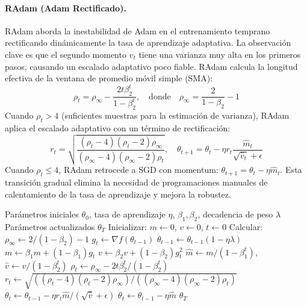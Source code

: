 \documentclass[11pt,a4paper]{article}
\begin{document}
\paragraph{RAdam (Adam Rectificado).}
RAdam aborda la inestabilidad de Adam en el entrenamiento temprano rectificando dinámicamente la tasa de aprendizaje adaptativa. La observación clave es que el segundo momento $v_t$ tiene una varianza muy alta en los primeros pasos, causando un escalado adaptativo poco fiable. RAdam calcula la longitud efectiva de la ventana de promedio móvil simple (SMA):
\[\rho_t = \rho_{\infty} - \frac{2t\beta_2^t}{1-\beta_2^t}, \quad \text{donde} \quad \rho_{\infty} = \frac{2}{1-\beta_2}-1\]
Cuando $\rho_t > 4$ (suficientes muestras para la estimación de varianza), RAdam aplica el escalado adaptativo con un término de rectificación:
\[r_t = \sqrt{\frac{(\rho_t-4)(\rho_t-2)\rho_{\infty}}{(\rho_{\infty}-4)(\rho_{\infty}-2)\rho_t}}, \quad \theta_{t+1} = \theta_t - \eta r_t \frac{\hat{m}_t}{\sqrt{\hat{v}_t}+\epsilon}\]
Cuando $\rho_t \leq 4$, RAdam retrocede a SGD con momentum: $\theta_{t+1} = \theta_t - \eta\hat{m}_t$. Esta transición gradual elimina la necesidad de programaciones manuales de calentamiento de la tasa de aprendizaje y mejora la robustez.

\begin{algorithm}[H]
\caption{RAdam (Adam Rectificado)}
\label{alg:radam}
\begin{algorithmic}[1]
\Require Parámetros iniciales $\theta_0$, tasa de aprendizaje $\eta$, $\beta_1, \beta_2$, decadencia de peso $\lambda$
\Ensure Parámetros actualizados $\theta_T$
\State Inicializar: $m \gets 0$, $v \gets 0$, $t \gets 0$
\State Calcular: $\rho_\infty \gets 2/(1-\beta_2) - 1$
    \State $g_t \gets \nabla f(\theta_{t-1})$
        \State $\theta_{t-1} \gets \theta_{t-1}(1 - \eta\lambda)$
    \EndIf
    \State $m \gets \beta_1 m + (1-\beta_1) g_t$
    \State $v \gets \beta_2 v + (1-\beta_2) g_t^2$
    \State $\hat{m} \gets m/(1-\beta_1^t)$, $\hat{v} \gets v/(1-\beta_2^t)$
    \State $\rho_t \gets \rho_\infty - 2t \beta_2^t / (1 - \beta_2^t)$
        \State $r_t \gets \sqrt{((\rho_t-4)(\rho_t-2)\rho_\infty) / ((\rho_\infty-4)(\rho_\infty-2)\rho_t)}$
        \State $\theta_t \gets \theta_{t-1} - \eta r_t \hat{m} / (\sqrt{\hat{v}} + \epsilon)$
    \Else
        \State $\theta_t \gets \theta_{t-1} - \eta \hat{m}$ 
    \EndIf
\EndFor
\Return $\theta_T$
\end{algorithmic}
\end{algorithm}
\end{document}
